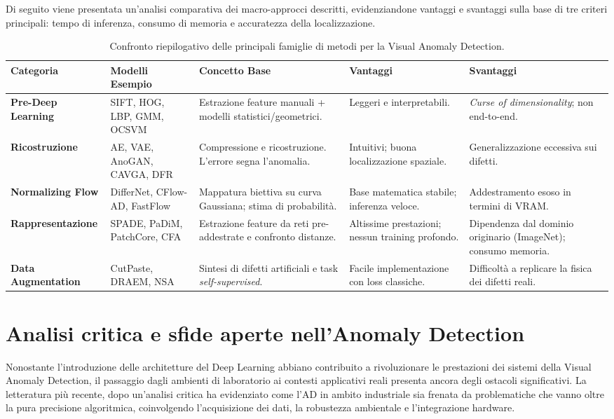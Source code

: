 Di seguito viene presentata un'analisi comparativa dei macro-approcci descritti, evidenziandone vantaggi e svantaggi sulla base di tre criteri principali: tempo di inferenza, consumo di memoria e accuratezza della localizzazione.

\begin{table}[htbp]
\centering
\small
\caption{Confronto riepilogativo delle principali famiglie di metodi per la Visual Anomaly Detection.}
\label{tab:metodi_ad}
\renewcommand{\arraystretch}{1.3} %
\begin{tabular}{p{2.5cm} p{2.5cm} p{4.5cm} p{2.5cm} p{2.5cm}}
\hline
\textbf{Categoria} & \textbf{Modelli Esempio} & \textbf{Concetto Base} & \textbf{Vantaggi} & \textbf{Svantaggi} \\ 
\hline
\textbf{Pre-Deep Learning} & SIFT, HOG, LBP, GMM, OCSVM & Estrazione feature manuali + modelli statistici/geometrici. & Leggeri e interpretabili. & \textit{Curse of dimensionality}; non end-to-end. \\ 
\textbf{Ricostruzione} & AE, VAE, AnoGAN, CAVGA, DFR & Compressione e ricostruzione. L'errore segna l'anomalia. & Intuitivi; buona localizzazione spaziale. & Generalizzazione eccessiva sui difetti. \\ 
\textbf{Normalizing Flow} & DifferNet, CFlow-AD, FastFlow & Mappatura biettiva su curva Gaussiana; stima di probabilità. & Base matematica stabile; inferenza veloce. & Addestramento esoso in termini di VRAM. \\ 
\textbf{Rappresentazione} & SPADE, PaDiM, PatchCore, CFA & Estrazione feature da reti pre-addestrate e confronto distanze. & Altissime prestazioni; nessun training profondo. & Dipendenza dal dominio originario (ImageNet); consumo memoria. \\ 
\textbf{Data Augmentation} & CutPaste, DRAEM, NSA & Sintesi di difetti artificiali e task \textit{self-supervised}. & Facile implementazione con loss classiche. & Difficoltà a replicare la fisica dei difetti reali. \\ 
\hline
\end{tabular}
\end{table}

\section{Analisi critica e sfide aperte nell'Anomaly Detection}

Nonostante l'introduzione delle architetture del Deep Learning abbiano contribuito a rivoluzionare le prestazioni dei sistemi della Visual Anomaly Detection, il passaggio dagli ambienti di laboratorio ai contesti applicativi reali presenta ancora degli ostacoli significativi.
La letteratura più recente, dopo un'analisi critica ha evidenziato come l'AD in ambito industriale sia frenata da problematiche che vanno oltre la pura precisione algoritmica, coinvolgendo l'acquisizione dei dati, la robustezza ambientale e l'integrazione hardware.\cite{Alzarooni_et_al._2024}\cite{Li_et_al._2025}

